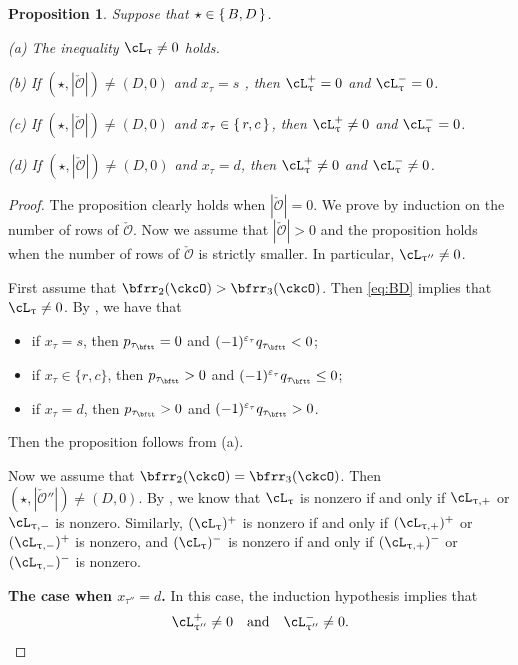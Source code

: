 \documentclass[11pt,a4paper]{amsart}
\def\abs#1{\left|{#1}\right|}
\newcommand{\CO}{{\mathcal {O}}}
\numberwithin{equation}{section}
\newtheorem{prop}[thm]{Proposition}
\theoremstyle{remark}
\def\ac{\cL}
\begin{document}
  \begin{prop}\label{lem:BD204}
Suppose that $\star \in \set{B,D}$.

\noindent (a) The inequality $\ac_{\uptau} \neq 0$ holds.

\noindent (b)  If $(\star, \abs{\check \CO})\neq (D, 0)$ and $x_{\tau}=s$ , then $\ac_{\uptau}^{+} =0$ and $\ac_{\uptau}^{-}=0$.

\noindent (c) If $(\star, \abs{\check \CO})\neq (D, 0)$ and $x_{\tau}\in \set{r,c}$, then $\ac_{\uptau}^{+} \neq 0$ and $\ac_{\uptau}^{-}=0$.

\noindent (d) If $(\star, \abs{\check \CO})\neq (D, 0)$ and $x_{\tau}=d$, then $\ac_{\uptau}^{+} \neq 0$ and
  $\ac_{\uptau}^{-}\neq 0$.

\end{prop}
\begin{proof}
The proposition clearly holds when $\abs{\check \CO}=0$. We prove by induction on the number of rows of $\check \CO$. Now we assume that $\abs{\check \CO}>0$ and the proposition holds when the number of rows of $\check \CO$ is strictly smaller. In particular, $\ac_{\uptau''}\neq 0$.

First assume that $\bfrr_{2}(\ckcO)>\bfrr_{3}(\ckcO)$. Then \eqref{eq:BD} implies that $\ac_\uptau\neq 0$. By , we have that
\begin{itemize}
    \item if $x_\tau=s$, then $p_{\tau_\bftt}=0$ and $(-1)^{\varepsilon_\tau} q_{\tau_\bftt}<0$;
      \item
      if $x_\tau\in \{r,c\}$, then $p_{\tau_\bftt}>0$ and $(-1)^{\varepsilon_\tau} q_{\tau_\bftt}\leq 0$;
      \item
      if $x_\tau=d$, then $p_{\tau_\bftt}>0$ and $(-1)^{\varepsilon_\tau} q_{\tau_\bftt}> 0$.
\end{itemize}
 Then the proposition follows from  (a).

Now we assume that $\bfrr_{2}(\ckcO)=\bfrr_{3}(\ckcO)$. Then $(\star, \abs{\check \CO''})\neq (D,0)$. By , we know that $\ac_\uptau $ is nonzero  if and only if $\ac_{\uptau,+}$ or $\ac_{\uptau,-}$ is nonzero. Similarly, $(\ac_\uptau)^+ $ is nonzero  if and only if $(\ac_{\uptau,+})^+$ or $(\ac_{\uptau,-})^+$ is nonzero, and $(\ac_\uptau)^- $ is nonzero  if and only if $(\ac_{\uptau,+})^-$ or $(\ac_{\uptau,-})^-$ is nonzero.

{\bf The case when  $x_{\tau''}=d$.} In this case,  the induction hypothesis implies that \[
\ac_{\uptau''}^+\neq 0\quad\textrm{and} \quad \ac_{\uptau''}^-\neq 0.
\]


\end{proof}
\end{document}
